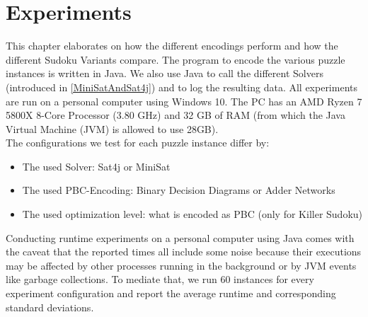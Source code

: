 \chapter{Experiments}
This chapter elaborates on how the different encodings perform and how the different Sudoku Variants compare.
The program to encode the various  puzzle instances is written in Java. We also use Java to call the different Solvers (introduced in \ref{MiniSatAndSat4j}) and to log the resulting data. All experiments are run on a personal computer using Windows 10. The PC has an AMD Ryzen 7 5800X 8-Core Processor (3.80 GHz) and 32 GB of RAM (from which the Java Virtual Machine (JVM) is allowed to use 28GB).\\

The configurations we test for each puzzle instance differ by: 
\begin{itemize}
    \item The used Solver: Sat4j or MiniSat
    \item The used PBC-Encoding: Binary Decision Diagrams or Adder Networks
    \item The used optimization level: what is encoded as PBC (only for Killer Sudoku)
\end{itemize}

Conducting runtime experiments on a personal computer using Java comes with the caveat that the reported times all include some noise because their executions may be affected by other processes running in the background or by JVM events like garbage collections. To mediate that, we run 60 instances for every experiment configuration and report the average runtime and corresponding standard deviations.\\

\newpage
